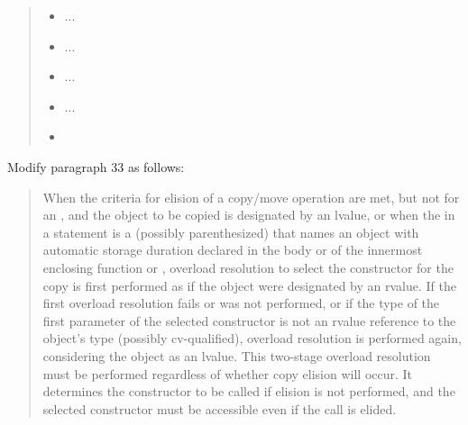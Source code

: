 \begin{quote}
\begin{itemize}
  \item ...
  \item ...
  \item ...
  \item ...
  \item
\end{itemize}
\end{quote}

Modify paragraph 33 as follows:

\begin{quote}
\setcounter{Paras}{32}
\pnum
When the criteria for elision of a copy/move operation are met,
but not for an ,
and the object
to be copied is designated by an lvalue,
or when the  in a    statement
is a (possibly parenthesized) 
that names an object with automatic storage duration declared in the body
or  of the innermost enclosing
function or ,
overload resolution to select the constructor
for the copy is first performed as if the object were designated by an rvalue.
If the first overload resolution fails or was not performed,
or if the type of the first parameter of the selected
constructor is not an rvalue reference to the object's type (possibly cv-qualified),
overload resolution is performed again, considering the object as an lvalue.
\enternote This two-stage overload resolution must be performed regardless
of whether copy elision will occur. It determines the constructor to be called if
elision is not performed, and the selected constructor must be accessible even if
the call is elided. \exitnote
\end{quote}